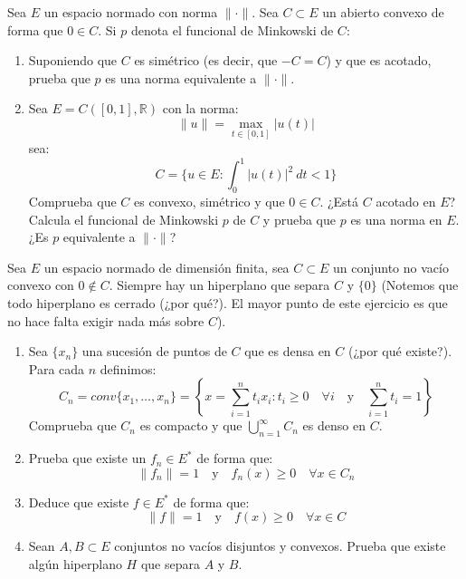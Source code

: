 \begin{ejercicio}
    Sea $E$ un espacio normado con norma $\|\cdot \|$. Sea $C\subset E$ un abierto convexo de forma que $0\in C$. Si $p$ denota el funcional de Minkowski de $C$:
    \begin{enumerate}[label=\alph*)]
        \item Suponiendo que $C$ es simétrico (es decir, que $-C=C$) y que es acotado, prueba que $p$ es una norma equivalente a $\|\cdot \|$.
        \item Sea $E = C([0,1], \mathbb{R})$ con la norma:
            \begin{equation*}
                \|u\| = \max_{t\in [0,1]}|u(t)|
            \end{equation*}
            sea:
            \begin{equation*}
                C = \{u\in E: \int_{0}^{1} |u(t)|^2~dt < 1 \}
            \end{equation*}
            Comprueba que $C$ es convexo, simétrico y que $0\in C$. ¿Está $C$ acotado en $E$? Calcula el funcional de Minkowski $p$ de $C$ y prueba que $p$ es una norma en $E$. ¿Es $p$ equivalente a $\|\cdot \|$?
    \end{enumerate}
\end{ejercicio}

\begin{ejercicio}
    Sea $E$ un espacio normado de dimensión finita, sea $C\subset E$ un conjunto no vacío convexo con $0\notin C$. Siempre hay un hiperplano que separa $C$ y $\{0\}$ (Notemos que todo hiperplano es cerrado (¿por qué?). El mayor punto de este ejercicio es que no hace falta exigir nada más sobre $C$).
    \begin{enumerate}[label=\alph*)]
        \item Sea $\{x_n\}$ una sucesión de puntos de $C$ que es densa en $C$ (¿por qué existe?). Para cada $n$ definimos:
            \begin{equation*}
                C_n = conv\{x_1, \ldots, x_n\} = \left\{x=\sum_{i=1}^{n}t_ix_i : t_i\geq 0 \quad \forall i \quad \text{y}\quad \sum_{i=1}^{n}t_i = 1 \right\}
            \end{equation*}
            Comprueba que $C_n$ es compacto y que $\bigcup\limits_{n=1}^\infty C_n$ es denso en $C$.
        \item Prueba que existe un $f_n \in E^\ast$ de forma que:
            \begin{equation*}
                \|f_n\| = 1 \quad \text{y}\quad f_n(x) \geq 0 \quad \forall x\in C_n
            \end{equation*}
        \item Deduce que existe $f\in E^\ast$ de forma que:
            \begin{equation*}
                \|f\| = 1 \quad \text{y}\quad f(x)\geq 0 \quad \forall x\in C
            \end{equation*}
        \item Sean $A,B\subset E$ conjuntos no vacíos disjuntos y convexos. Prueba que existe algún hiperplano $H$ que separa $A$ y $B$.
    \end{enumerate}
\end{ejercicio}

